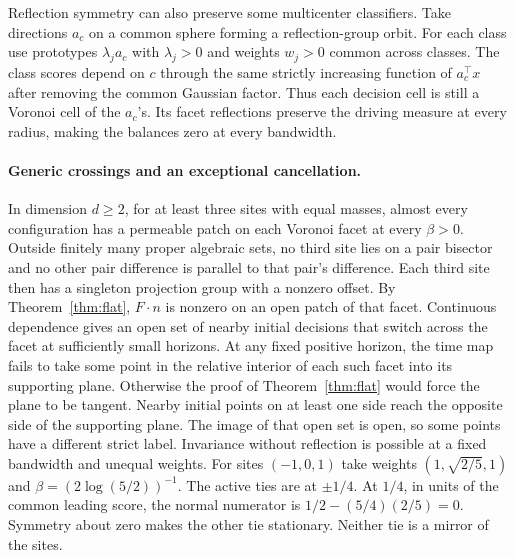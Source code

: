 Reflection symmetry can also preserve some multicenter classifiers.
Take directions $a_c$ on a common sphere forming a reflection-group orbit.
For each class use prototypes $\lambda_j a_c$ with $\lambda_j>0$ and
weights $w_j>0$ common across classes. The class scores depend on $c$
through the same strictly increasing function of $a_c^\top x$ after
removing the common Gaussian factor. Thus each decision cell is still
a Voronoi cell of the $a_c$'s. Its facet reflections preserve the
driving measure at every radius, making the balances zero at every
bandwidth.

\paragraph{Generic crossings and an exceptional cancellation.}
In dimension $d\ge2$, for at least three sites with equal masses, almost
every configuration has a permeable patch on each Voronoi facet at every
$\beta>0$. Outside finitely many proper algebraic sets, no third site
lies on a pair bisector and no other pair difference is parallel to
that pair's difference. Each third site then has a singleton projection
group with a nonzero offset. By Theorem~\ref{thm:flat}, $F\cdot n$ is
nonzero on an open patch of that facet. Continuous dependence gives
an open set of nearby initial decisions that switch across the facet
at sufficiently small horizons. At any fixed positive horizon,
the time map fails to take some point in the relative interior of
each such facet into its supporting plane. Otherwise the proof of
Theorem~\ref{thm:flat} would force the plane to be tangent. Nearby
initial points on at least one side reach the opposite side of the
supporting plane. The image of that open set is open, so some
points have a different strict label. Invariance without
reflection is possible at a fixed bandwidth and unequal weights.
For sites $(-1,0,1)$ take weights $(1,\sqrt{2/5},1)$ and
$\beta=(2\log(5/2))^{-1}$. The active ties are at $\pm1/4$. At $1/4$,
in units of the common leading score, the normal numerator is
$1/2-(5/4)(2/5)=0$. Symmetry about zero makes the other tie stationary.
Neither tie is a mirror of the sites.

